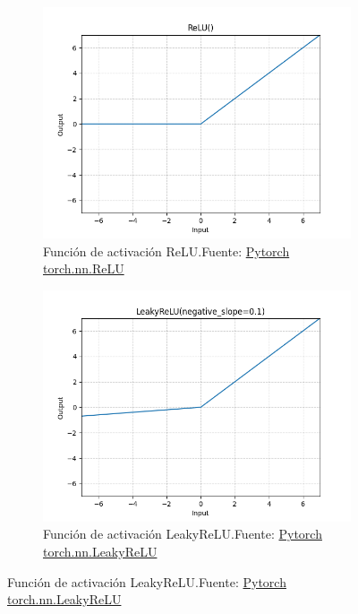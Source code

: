 \begin{figure}[H]
    \centering
    \captionsetup{justification=centering}

    \begin{subfigure}{.475\linewidth}
        \centering
        \includegraphics[width=0.75\linewidth]{figures/equations/ReLU.png}
        \caption{Función de activación ReLU.\newline{}Fuente: \href{https://pytorch.org/docs/stable/generated/torch.nn.ReLU.html}{Pytorch torch.nn.ReLU}}
        \label{subfig:torch.nn.ReLU}
    \end{subfigure}\hfill %
    \begin{subfigure}{.475\linewidth}
        \centering
        \includegraphics[width=0.75\linewidth]{figures/equations/LeakyReLU.png}
        \caption{Función de activación LeakyReLU.\newline{}Fuente: \href{https://pytorch.org/docs/stable/generated/torch.nn.LeakyReLU.html}{Pytorch torch.nn.LeakyReLU}}
        \label{subfig:torch.nn.LeakyReLU}
    \end{subfigure}


\end{figure}
